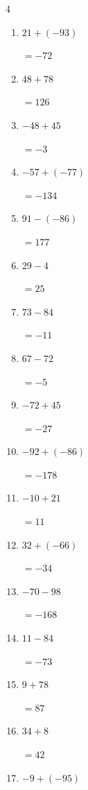 \begin{multicols}{4}
\begin{enumerate}
        $=-52$

  \item $21+(-93)$

        $=-72$

  \item $48+78$

        $=126$

  \item $-48+45$

        $=-3$

  \item $-57+(-77)$

        $=-134$

  \item $91-(-86)$

        $=177$

  \item $29-4$

        $=25$

  \item $73-84$

        $=-11$

\columnbreak %

  \item $67-72$

        $=-5$

  \item $-72+45$

        $=-27$

  \item $-92+(-86)$

        $=-178$

  \item $-10+21$

        $=11$

  \item $32+(-66)$

        $=-34$

  \item $-70-98$

        $=-168$

  \item $11-84$

        $=-73$

  \item $9+78$

        $=87$

  \item $34+8$

        $=42$

  \item $-9+(-95)$


\end{enumerate}
\end{multicols}
